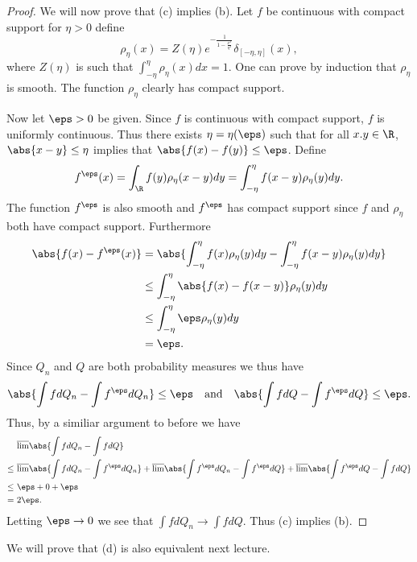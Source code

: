 \begin{proof}
    We will now prove that (c) implies (b). Let $f$ be continuous with compact support for $\eta > 0$ define
    \[\rho_\eta(x) = Z(\eta)e^{-\frac{1}{1-\frac{x^2}{\eta^2}}}\delta_{[-\eta,\eta]}(x), \]
    where $Z(\eta)$ is such that $\int_{-\eta}^\eta \rho_\eta(x)dx=1$. One can prove by induction that $\rho_\eta$ is smooth. The function $\rho_\eta$ clearly has compact support. 
    
    Now let $\eps > 0$ be given. Since $f$ is continuous with compact support, $f$ is uniformly continuous. Thus there exists $\eta = \eta(\eps)$ such that for all $x. y \in \R$, $\abs{x-y} \le \eta$ implies that $\abs{f(x)-f(y)}\le \eps$. Define
    \[f^\eps(x) = \int_\R f(y)\rho_\eta(x-y)dy = \int_{-\eta}^\eta f(x-y)\rho_\eta(y)dy.\] 
    The function $f^\eps$ is also smooth and $f^\eps$ has compact support since $f$ and $\rho_\eta$ both have compact support. Furthermore 
    \begin{align*}
        \abs{f(x)-f^\eps(x)} & =\abs{\int_{-\eta}^\eta  f(x)\rho_\eta(y)dy-\int_{-\eta}^\eta f(x-y)\rho_\eta(y)dy}\\
        &\le \int_{-\eta}^\eta \abs{f(x)-f(x-y)}\rho_\eta(y)dy\\
        &\le  \int_{-\eta}^\eta\eps \rho_\eta(y)dy\\
        &= \eps.
    \end{align*}
    Since $Q_n$ and $Q$ are both probability measures we thus have 
    \[\abs{\int f dQ_n - \int f^\eps dQ_n } \le \eps~~~\text{and}~~~\abs{\int f dQ - \int f^\eps dQ} \le \eps.\]
    Thus, by a similiar argument to before we have 
    \begin{align*}
        &~\overline{\lim} \abs{\int f dQ_n - \int f dQ}\\
        \le & ~\overline{\lim} \abs{\int f dQ_n - \int f^\eps dQ_n}+\overline{\lim} \abs{\int f^\eps dQ_n - \int f^\eps dQ}+\overline{\lim} \abs{\int f^\eps dQ - \int f dQ}\\
        \le & ~\eps + 0 + \eps \\
        =& ~2\eps.
    \end{align*}
    Letting $\eps \to 0$ we see that $\int fdQ_n \to \int fdQ$. Thus (c) implies (b).
\end{proof}


We will prove that (d) is also equivalent next lecture.



